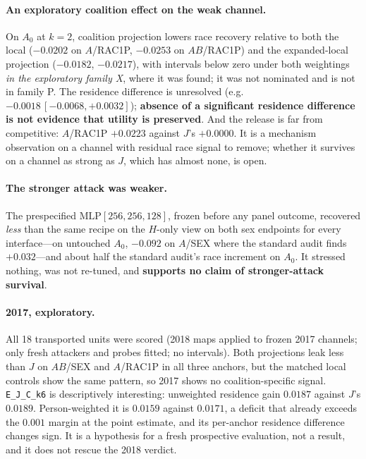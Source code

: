 \documentclass[10pt]{article}
\begin{document}
\paragraph{An exploratory coalition effect on the weak channel.} On $A_0$ at $k=2$, coalition projection
lowers race recovery relative to both the local ($-0.0202$ on $A$/RAC1P, $-0.0253$ on $AB$/RAC1P) and the
expanded-local projection ($-0.0182$, $-0.0217$), with intervals below zero under both weightings
\emph{in the exploratory family X}, where it was found; it was not nominated and is not in family P. The
residence difference is unresolved (e.g.\ $-0.0018\,[-0.0068,+0.0032]$); \textbf{absence of a significant
residence difference is not evidence that utility is preserved}. And the release is far from competitive:
$A$/RAC1P $+0.0223$ against $J$'s $+0.0000$. It is a mechanism observation on a channel with residual race
signal to remove; whether it survives on a channel as strong as $J$, which has almost none, is open.

\paragraph{The stronger attack was weaker.} The prespecified $\mathrm{MLP}[256,256,128]$, frozen before any
panel outcome, recovered \emph{less} than the same recipe on the $H$-only view on both sex endpoints for every
interface---on untouched $A_0$, $-0.092$ on $A$/SEX where the standard audit finds $+0.032$---and about half
the standard audit's race increment on $A_0$. It stressed nothing, was not re-tuned, and \textbf{supports no
claim of stronger-attack survival}.

\paragraph{2017, exploratory.} All 18 transported units were scored (2018 maps applied to frozen 2017
channels; only fresh attackers and probes fitted; no intervals). Both projections leak less than $J$ on
$AB$/SEX and $A$/RAC1P in all three anchors, but the matched local controls show the same pattern, so 2017
shows no coalition-specific signal. \texttt{E\_J\_C\_k6} is descriptively interesting: unweighted residence
gain $0.0187$ against $J$'s $0.0189$. Person-weighted it is $0.0159$ against $0.0171$, a deficit that already
exceeds the $0.001$ margin at the point estimate, and its per-anchor residence difference changes sign.
It is a hypothesis for a fresh prospective evaluation, not a result, and it does not rescue the 2018
verdict.
\end{document}
